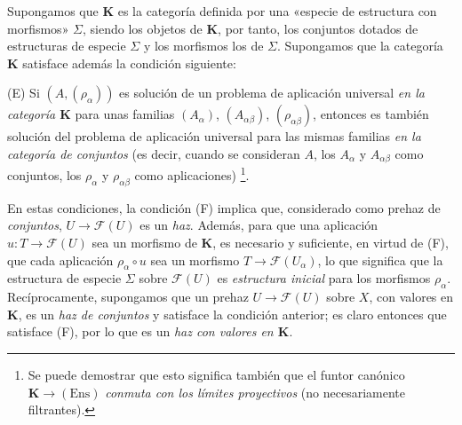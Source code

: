 \begin{env}[3.1.3]
\label{0.3.1.3-fr}
Supongamos que $\boldsymbol{K}$ es la categoría definida por una «especie de
estructura con morfismos» $\Sigma$, siendo los objetos de $\boldsymbol{K}$, por tanto,
los conjuntos dotados de estructuras de especie $\Sigma$ y los morfismos los de
$\Sigma$. Supongamos que la categoría $\boldsymbol{K}$ satisface además la
condición siguiente:

\smallskip
\noindent
\textup{(E)} Si $(A,(\rho_\alpha))$ es solución de un problema de aplicación
universal \emph{en la categoría $\boldsymbol{K}$} para unas familias
$(A_\alpha)$, $(A_{\alpha\beta})$, $(\rho_{\alpha\beta})$, entonces es también
solución del problema de aplicación universal para las mismas familias
\emph{en la categoría de conjuntos} (es decir, cuando se consideran $A$,
los $A_\alpha$ y $A_{\alpha\beta}$ como conjuntos, los $\rho_\alpha$ y
$\rho_{\alpha\beta}$ como aplicaciones)%
\footnote{Se puede demostrar que esto significa también que el funtor canónico
$\boldsymbol{K}\to(\mathrm{Ens})$ \emph{conmuta con los límites proyectivos} (no
necesariamente filtrantes).}.

En estas condiciones, la condición (F) implica que, considerado como
prehaz de \emph{conjuntos}, $U\to\mathcal{F}(U)$ es un \emph{haz}.
Además, para que una aplicación $u:T\to\mathcal{F}(U)$ sea un morfismo de
$\boldsymbol{K}$, es necesario y suficiente, en virtud de (F), que cada aplicación
$\rho_\alpha\circ u$ sea un morfismo $T\to\mathcal{F}(U_\alpha)$, lo que
significa que la estructura de especie $\Sigma$ sobre $\mathcal{F}(U)$ es
\emph{estructura inicial} para los morfismos $\rho_\alpha$. Recíprocamente,
supongamos que un prehaz $U\to\mathcal{F}(U)$ sobre $X$, con valores en
$\boldsymbol{K}$, es un \emph{haz de conjuntos} y satisface la condición
anterior; es claro entonces que satisface (F), por lo que es un
\emph{haz con valores en $\boldsymbol{K}$}.
\end{env}
